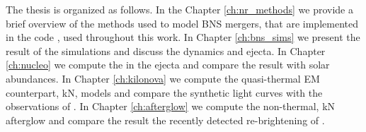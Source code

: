 The thesis is organized as follows.
In the Chapter \ref{ch:nr_methods} we provide a brief overview of the methods used to model  \ac{BNS} mergers, 
that are implemented in the code \wisky{}, used throughout this work.
In Chapter \ref{ch:bns_sims} we present the result of the simulations and discuss the \pmerg{} dynamics and ejecta.
In Chapter \ref{ch:nucleo} we compute the \rproc{} \nuc{} in the ejecta and compare the result with 
solar abundances.
In Chapter \ref{ch:kilonova} we compute the quasi-thermal \ac{EM} counterpart, \ac{kN}, models and compare 
the synthetic light curves with the observations of \AT{}.
In Chapter \ref{ch:afterglow} we compute the non-thermal, \ac{kN} afterglow and compare the 
result the recently detected re-brightening of \GRB{}.